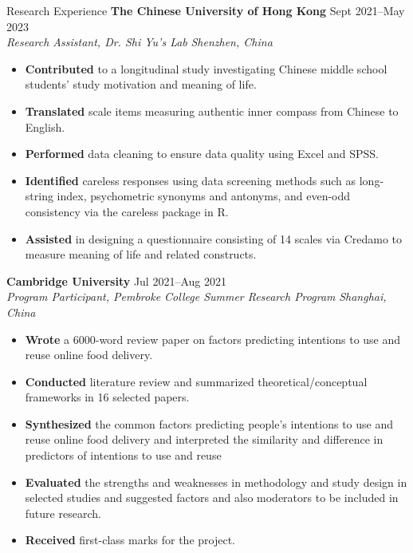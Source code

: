 \documentclass{resume} %
\begin{document}
\begin{rSection}{Research Experience}
\textbf{The Chinese University of Hong Kong} \hfill{Sept 2021--May 2023} \\
\textit{Research Assistant, Dr. Shi Yu’s Lab} \hfill{\textit{Shenzhen, China}}
 \begin{itemize}
    \itemsep -5pt {} 
    \item \textbf{Contributed} to a longitudinal study investigating Chinese middle school students’ study motivation and meaning of life.
    \item \textbf{Translated} scale items measuring authentic inner compass from Chinese to English.
    \item \textbf{Performed} data cleaning to ensure data quality using Excel and SPSS.
    \item \textbf{Identified} careless responses using data screening methods such as long-string index, psychometric synonyms and antonyms, and even-odd consistency via the careless package in R.
    \item \textbf{Assisted} in designing a questionnaire consisting of 14 scales via Credamo to measure meaning of life and related constructs. 
 \end{itemize}

\textbf{Cambridge University} \hfill{Jul 2021--Aug 2021} \\
\textit{Program Participant, Pembroke College Summer Research Program} \hfill{\textit{Shanghai, China}}
 \begin{itemize}
    \itemsep -5pt {} 
    \item \textbf{Wrote} a 6000-word review paper on factors predicting intentions to use and reuse online food delivery.
    \item \textbf{Conducted} literature review and summarized theoretical/conceptual frameworks in 16 selected papers.
    \item \textbf{Synthesized} the common factors predicting people's intentions to use and reuse online food delivery and interpreted the similarity and difference in predictors of intentions to use and reuse
    \item \textbf{Evaluated} the strengths and weaknesses in methodology and study design in selected studies and suggested factors and also moderators to be included in future research.
    \item \textbf{Received} first-class marks for the project.  
 \end{itemize}

\end{rSection} 
\end{document}
